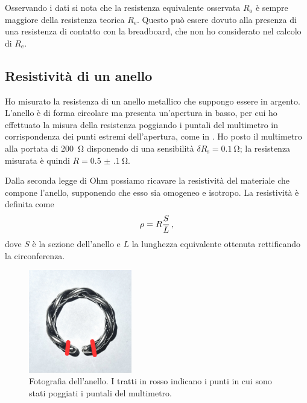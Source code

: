             Osservando i dati si nota che la resistenza equivalente osservata $R_\text{o}$ è sempre maggiore della resistenza teorica $R_\text{e}$. Questo può essere dovuto alla presenza di una resistenza di contatto con la breadboard, che non ho considerato nel calcolo di $R_\text{e}$.

        \subsection{Resistività di un anello}
            Ho misurato la resistenza di un anello metallico che suppongo essere in argento. L'anello è di forma circolare ma presenta un'apertura in basso, per cui ho effettuato la misura della resistenza poggiando i puntali del multimetro in corrispondenza dei punti estremi dell'apertura, come in . Ho posto il multimetro alla portata di \SI{200}{\ohm} disponendo di una sensibilità $\delta R_\text{s} = \SI{0.1}{\ohm}$; la resistenza misurata è quindi $R = \SI{0.5(1)}{\ohm}$.

            Dalla seconda legge di Ohm possiamo ricavare la resistività del materiale che compone l'anello, supponendo che esso sia omogeneo e isotropo. La resistività è definita come
            \begin{equation}
                \rho = R\frac{S}{L}
                \,,
                \label{eq:mul:ohm-law}
            \end{equation}
            dove $S$ è la sezione dell'anello e $L$ la lunghezza equivalente ottenuta rettificando la circonferenza.
            \begin{figure}
                \centering
                \includegraphics[width=0.4\textwidth]{images/multimetro/anello.jpg}
                \caption{Fotografia dell'anello. I tratti in rosso indicano i punti in cui sono stati poggiati i puntali del multimetro.}
                \label{fig:mul:anello}
            \end{figure}

